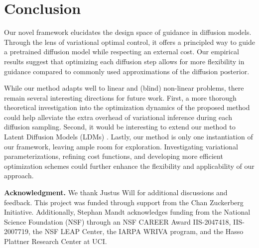 \section{Conclusion}

Our novel framework elucidates the design space of guidance in diffusion models. Through the lens of variational optimal control, it offers a principled way to guide a pretrained diffusion model while respecting an external cost. Our empirical results suggest that optimizing each diffusion step allows for more flexibility in guidance compared to commonly used approximations of the diffusion posterior.


While our method adapts well to linear and (blind) non-linear problems, there remain several interesting directions for future work. First, a more thorough theoretical investigation into the optimization dynamics of the proposed method could help alleviate the extra overhead of variational inference during each diffusion sampling. Second, it would be interesting to extend our method to Latent Diffusion Models (LDMs) \citep{rombach2022high}. Lastly, our method is only one instantiation of our framework, leaving ample room for exploration. Investigating variational parameterizations, refining cost functions, and developing more efficient optimization schemes could further enhance the flexibility and applicability of our approach.


\textbf{Acknowledgment.} We thank Justus Will for additional discussions and feedback. This project was funded through support from the Chan Zuckerberg Initiative. Additionally, Stephan Mandt acknowledges funding from the National Science Foundation (NSF) through an NSF CAREER Award IIS-2047418, IIS-2007719, the NSF LEAP Center, the IARPA WRIVA program, and the Hasso Plattner Research Center at UCI.
